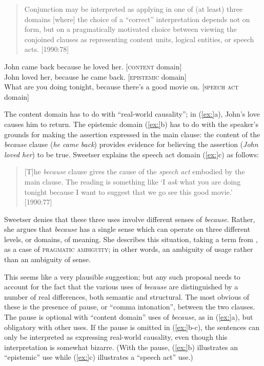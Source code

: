 \begin{quote}
Conjunction may be interpreted as applying in one of (at least) three domains [where] the choice of a “correct” interpretation depends not on form, but on a pragmatically motivated choice between viewing the conjoined clauses as representing content units, logical entities, or speech acts. [1990:78]
\end{quote}

\ea
\ea John came back because he loved her.   [\textsc{content} domain]\\
\ex John loved her, because he came back.   [\textsc{epistemic} domain]\\
\ex What are you doing tonight, because there’s a good movie on. [\textsc{speech act} domain]
                       \z
\z


The content domain has to do with “real-world causality”; in (\ref{ex:}a), John’s love causes him to return. The epistemic domain (\ref{ex:}b) has to do with the speaker’s grounds for making the assertion expressed in the main clause: the content of the \textit{because} clause (\textit{he came back}) provides evidence for believing the assertion (\textit{John loved her}) to be true. Sweetser explains the speech act domain (\ref{ex:}c) as follows:


\begin{quote}
{}[T]he \textit{because} clause gives the cause of the \textit{speech act} embodied by the main clause. The reading is something like ‘I \textit{ask} what you are doing tonight because I want to suggest that we go see this good movie.’ [1990:77]
\end{quote}


Sweetser denies that these three uses involve different senses of \textit{because}. Rather, she argues that \textit{because} has a single sense which can operate on three different levels, or domains, of meaning. She describes this situation, taking a term from \citet{Horn1985}, as a case of \textsc{pragmatic ambiguity}; in other words, an ambiguity of usage rather than an ambiguity of sense.



This seems like a very plausible suggestion; but any such proposal needs to account for the fact that the various uses of \textit{because} are distinguished by a number of real differences, both semantic and structural. The most obvious of these is the presence of pause, or “comma intonation”, between the two clauses. The pause is optional with “content domain” uses of \textit{because}, as in (\ref{ex:}a), but obligatory with other uses. If the pause is omitted in (\ref{ex:}b-c), the sentences can only be interpreted as expressing real-world causality, even though this interpretation is somewhat bizarre. (With the pause, (\ref{ex:}b) illustrates an “epistemic” use while (\ref{ex:}c) illustrates a “speech act” use.)


